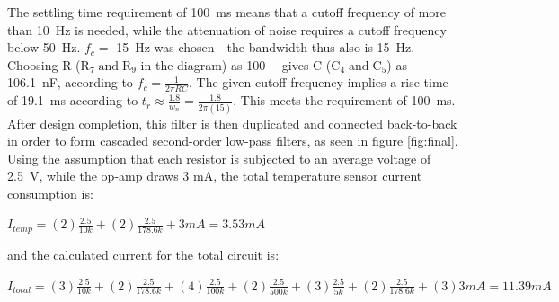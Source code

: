 The settling time requirement of \SI{100}{ms} means that a cutoff frequency of more than \SI{10}{Hz} is needed, while the attenuation of noise requires a cutoff frequency below \SI{50}{Hz}. $f_c = $ \SI{15}{Hz} was chosen - the bandwidth thus also is \SI{15}{Hz}. Choosing R ($\mathrm{R_7 \; and \; R_9}$ in the diagram) as \SI{100}{\kilo\Omega} gives C ($\mathrm{C_4 \; and \; C_5}$) as \SI{106.1}{nF}, according to $f_c=\frac{1}{2 \pi RC}$. The given cutoff frequency implies a rise time of \SI{19.1}{ms} according to $t_{r} \approx \frac{1.8}{w_{n}} = \frac{1.8}{2 \pi (15)}$\cite{cs}. This meets the requirement of \SI{100}{ms}. After design completion, this filter is then duplicated and connected back-to-back in order to form cascaded second-order low-pass filters, as seen in figure \ref{fig:final}.\\

Using the assumption that each resistor is subjected to an average voltage of \SI{2.5}{\volt}, while the op-amp draws 3 mA\cite{tlc2272}, the total temperature sensor current consumption is: 

$I_{temp} = (2)\frac{2.5}{10k} + (2)\frac{2.5}{178.6k} + 3mA = 3.53mA$

and the calculated current for the total circuit is:

$I_{total} = (3)\frac{2.5}{10k} + (2)\frac{2.5}{178.6k} + (4)\frac{2.5}{100k} + (2)\frac{2.5}{500k} + (3)\frac{2.5}{5k} + (2)\frac{2.5}{178.6k} + (3)3mA = 11.39mA$

 
